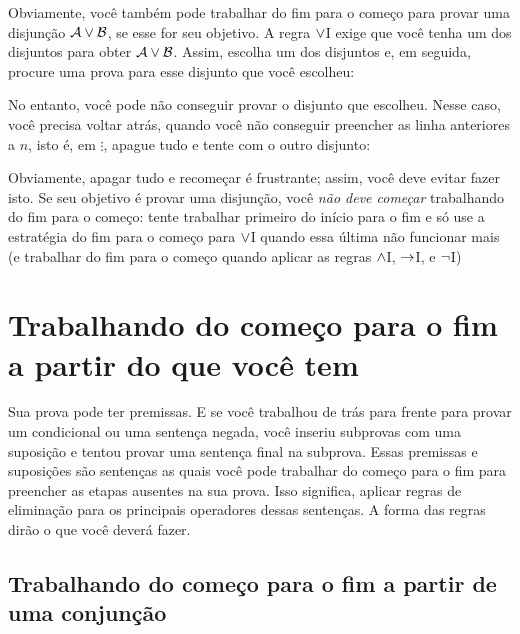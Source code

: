 Obviamente, voc\^e tamb\'em pode trabalhar do fim para o come\c co para provar  uma disjun\c c\~ao $\mathcal{A} \vee \mathcal{B}$, se esse for seu objetivo. A regra
 $\vee$I exige que voc\^e tenha um dos disjuntos para obter $\mathcal{A} \vee \mathcal{B}$.
 Assim, escolha um dos disjuntos e,  em seguida,  procure uma prova para esse  disjunto  que voc\^e escolheu:
\begin{fitchproof}
	\ellipsesline
\end{fitchproof}
 No entanto, voc\^e pode n\~ao conseguir provar o  disjunto que escolheu. Nesse caso, voc\^e precisa voltar atr\'as, quando voc\^e n\~ao conseguir preencher as linha anteriores a $n$, isto \'e, em $\vdots$, apague tudo e tente com o outro disjunto:
\begin{fitchproof}
	\ellipsesline 
\end{fitchproof}
 Obviamente, apagar tudo e recome\c car \'e frustrante;  assim, voc\^e deve evitar fazer isto. Se seu objetivo \'e  provar uma disjun\c c\~ao,  voc\^e \emph{n\~ao deve come\c car} trabalhando do fim para o come\c co: tente trabalhar primeiro do in\'icio para o fim e s\'o use a estrat\'egia  do fim para o come\c co para $\vee$I   quando essa \'ultima n\~ao funcionar mais (e trabalhar do fim para o come\c co quando aplicar as regras $\wedge$I, $\rightarrow$I, e $\neg$I) 


\section{Trabalhando do come\c co para o fim a partir do que voc\^e tem}

Sua prova pode ter premissas. E se voc\^e trabalhou de tr\'as para frente para provar um condicional ou uma senten\c ca negada, voc\^e inseriu subprovas com uma suposi\c c\~ao e tentou provar uma senten\c ca final na subprova.  Essas premissas e suposi\c c\~oes s\~ao senten\c cas as quais voc\^e pode trabalhar do come\c co para o fim para preencher as etapas ausentes na sua prova. Isso significa, aplicar regras de  elimina\c c\~ao para os principais operadores dessas senten\c cas. A forma das regras dir\~ao o que voc\^e dever\'a fazer.
 

\subsection*{Trabalhando do come\c co para o fim a partir de uma conjun\c c\~ao}

